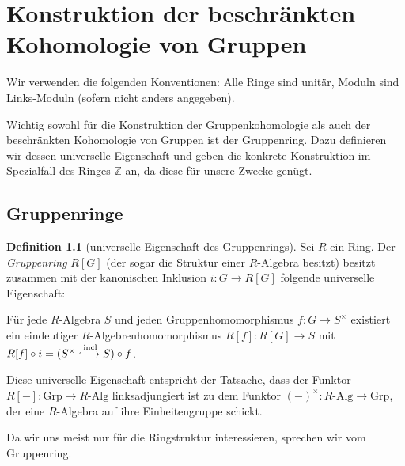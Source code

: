 \documentclass[a4paper,twoside,10pt]{scrreprt}
\newcommand{\Z}{\mathbb{Z}}
\theoremstyle{definition}
\newtheorem{definition}[satz]{Definition}
\begin{document}
\chapter{Konstruktion der beschränkten Kohomologie von Gruppen}
Wir verwenden die folgenden Konventionen: Alle Ringe sind unitär, Moduln sind Links-Moduln (sofern nicht anders angegeben).\par
Wichtig sowohl für die Konstruktion der Gruppenkohomologie als auch der beschränkten Kohomologie von Gruppen ist der Gruppenring. Dazu definieren wir dessen universelle Eigenschaft und geben die konkrete Konstruktion im Spezialfall des Ringes $\Z$ an, da diese für unsere Zwecke genügt.

\section{Gruppenringe}
\begin{definition}[universelle Eigenschaft des Gruppenrings]\label{def:GroupRingUnivProperty}
Sei $R$ ein Ring. Der \emph{Gruppenring} $R[G]$ (der sogar die Struktur einer $R$-Algebra besitzt) besitzt zusammen mit der kanonischen Inklusion $i:G\to R[G]$ folgende universelle Eigenschaft:\par
Für jede $R$-Algebra $S$ und jeden Gruppenhomomorphismus $f:G\to S^{\times}$ existiert ein eindeutiger $R$-Algebrenhomomorphismus $R[f]:R[G]\to S$ mit $R[f]\circ i=(S^{\times} \xhookrightarrow{\text{incl}} S)\circ f$.
\begin{center}
\end{center}
Diese universelle Eigenschaft entspricht der Tatsache, dass der Funktor $R[-]:\text{Grp}\to R\text{-Alg}$ linksadjungiert ist zu dem Funktor $(-)^{\times}:R\text{-Alg}\to \text{Grp}$, der eine $R$-Algebra auf ihre Einheitengruppe schickt.\par
Da wir uns meist nur für die Ringstruktur interessieren, sprechen wir vom Gruppenring.
\end{definition}
\end{document}
